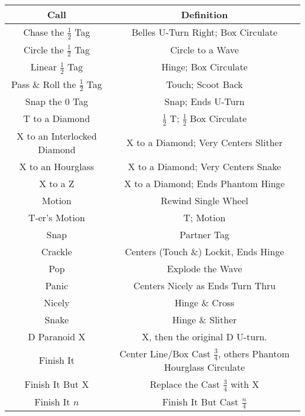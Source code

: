 \documentclass{article}
\begin{document}
\begin{center}
  \begin{tabular}{c | c}
    Call & Definition \\ \hline
    Chase the $\frac12$ Tag & Belles U-Turn Right; Box Circulate \\
    Circle the $\frac12$ Tag & Circle to a Wave \\
    Linear $\frac12$ Tag & Hinge; Box Circulate \\
    Pass \& Roll the $\frac12$ Tag & Touch; Scoot Back \\
    Snap the 0 Tag & Snap; Ends U-Turn \\
    T to a Diamond & $\frac12$ T; $\frac12$ Box Circulate \\
    X to an Interlocked Diamond & X to a Diamond; Very Centers Slither \\
    X to an Hourglass & X to a Diamond; Very Centers Snake \\
    X to a Z & X to a Diamond; Ends Phantom Hinge \\
    Motion & Rewind Single Wheel \\
    T-er's Motion & T; Motion \\
    Snap & Partner Tag \\
    Crackle & Centers (Touch \&) Lockit, Ends Hinge \\
    Pop & Explode the Wave \\
    Panic & Centers Nicely as Ends Turn Thru \\
    Nicely & Hinge \& Cross \\
    Snake & Hinge \& Slither \\
    D Paranoid X & X, then the original D U-turn. \\
    Finish It & Center Line/Box Cast $\frac34$, others Phantom Hourglass Circulate \\
    Finish It But X & Replace the Cast $\frac34$ with X \\
    Finish It $n$ & Finish It But Cast $\frac{n}{4}$ \\
  \end{tabular}
\end{center}
\end{document}
